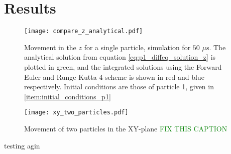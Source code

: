 \section{Results}\label{sec:results}



\begin{figure}[h!]
    \texttt{[image: compare\_z\_analytical.pdf]}
    \caption{Movement in the $z$ for a single particle, simulation for $50$ $\mu\mathrm{s}$. The analytical solution from equation \ref{eq:p1_diffeq_solution_z} is plotted in green, and the integrated solutions using the Forward Euler and Runge-Kutta 4 scheme is shown in red and blue respectively. Initial conditions are those of particle 1, given in \ref{item:initial_conditions_p1} }
\end{figure}




\newpage
\onecolumngrid

\begin{figure}[h!]
    \texttt{[image: xy\_two\_particles.pdf]}
    \caption{Movement of two particles in the XY-plane \textcolor{green}{FIX THIS CAPTION}}
\end{figure}


\twocolumngrid
 
testing agin





